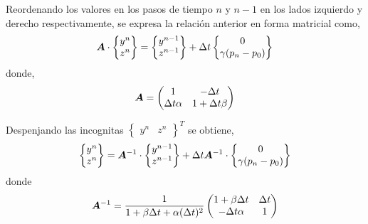 Reordenando los valores en los pasos de tiempo $n$ y $n-1$ en los lados izquierdo y derecho respectivamente, se expresa la relación anterior en forma matricial como,
\begin{equation}
\boldsymbol{A} \cdot \begin{Bmatrix}
y^n \\ z^n
\end{Bmatrix} =
\begin{Bmatrix}
y^{n-1} \\ z^{n-1}
\end{Bmatrix} +
\Delta t \begin{Bmatrix}
0 \\ \gamma (p_n-p_0)
\end{Bmatrix}
\end{equation}
donde,
\begin{equation}
\boldsymbol{A} = \begin{pmatrix}
1 & -\Delta t \\
\Delta t \alpha & 1+ \Delta t \beta
\end{pmatrix}
\end{equation}

Despenjando las incognitas $\begin{Bmatrix} y^n & z^n \end{Bmatrix} ^T$ se obtiene,
\begin{equation}
\begin{Bmatrix}
y^n \\ z^n
\end{Bmatrix} =
\boldsymbol{A}^{-1} \cdot \begin{Bmatrix}
y^{n-1} \\ z^{n-1}
\end{Bmatrix} +
\Delta t \boldsymbol{A}^{-1} \cdot  \begin{Bmatrix}
0 \\ \gamma (p_n-p_0)
\end{Bmatrix}
\end{equation}
donde
\begin{equation}
\boldsymbol{A}^{-1} = 
\dfrac{1}{1 + \beta \Delta t + \alpha (\Delta t) ^ 2}
\begin{pmatrix}
1+\beta \Delta t & \Delta t \\
-\Delta t \alpha & 1 
\end{pmatrix}
\end{equation}

